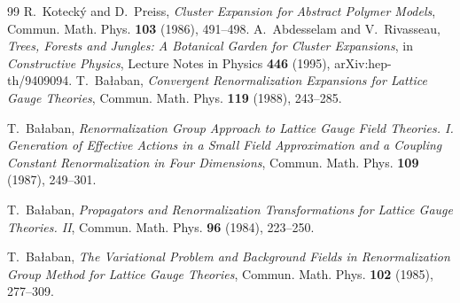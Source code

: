 \documentclass[11pt]{article}
\begin{document}
\begin{thebibliography}{99}
    R.~Koteck\'y and D.~Preiss,
    \emph{Cluster Expansion for Abstract Polymer Models},
    Commun. Math. Phys. \textbf{103} (1986), 491--498.
    A.~Abdesselam and V.~Rivasseau,
    \emph{Trees, Forests and Jungles: A Botanical Garden for Cluster Expansions},
    in \emph{Constructive Physics}, Lecture Notes in Physics \textbf{446} (1995),
    arXiv:hep-th/9409094.
    T.~Ba{\l}aban,
    \emph{Convergent Renormalization Expansions for Lattice Gauge Theories},
    Commun. Math. Phys. \textbf{119} (1988), 243--285.

    T.~Ba{\l}aban,
    \emph{Renormalization Group Approach to Lattice Gauge Field Theories. I. Generation of Effective Actions in a Small Field Approximation and a Coupling Constant Renormalization in Four Dimensions},
    Commun. Math. Phys. \textbf{109} (1987), 249--301.

    T.~Ba{\l}aban,
    \emph{Propagators and Renormalization Transformations for Lattice Gauge Theories. II},
    Commun. Math. Phys. \textbf{96} (1984), 223--250.

    T.~Ba{\l}aban,
    \emph{The Variational Problem and Background Fields in Renormalization Group Method for Lattice Gauge Theories},
    Commun. Math. Phys. \textbf{102} (1985), 277--309.

    \end{thebibliography}
\end{document}

